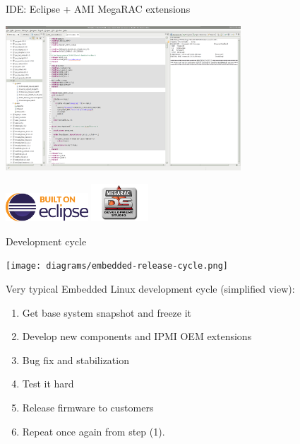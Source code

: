 \documentclass{beamer}
\begin{document}
  \begin{frame}{IDE: Eclipse + AMI MegaRAC extensions}
	  \begin{center}
		  \includegraphics[width=250pt]{screenshot/ide-screenshot.png}
	  \end{center}
	  \includegraphics[height=30pt]{logo/eclipse-mp-built.png}
	  \includegraphics[height=40pt]{logo/megarac-development-studio.png}
  \end{frame}
  

  \begin{frame}{Development cycle}

	  \begin{center}
		  \texttt{[image: diagrams/embedded-release-cycle.png]}
	  \end{center}

	  Very typical Embedded Linux development cycle (simplified view):
	  \begin{enumerate}
		  \item Get base system snapshot and freeze it
		  \item Develop new components and IPMI OEM extensions
		  \item Bug fix and stabilization
		  \item Test it hard
		  \item Release firmware to customers
		  \item Repeat once again from step  (1).
	  \end{enumerate}
  \end{frame}
\end{document}
